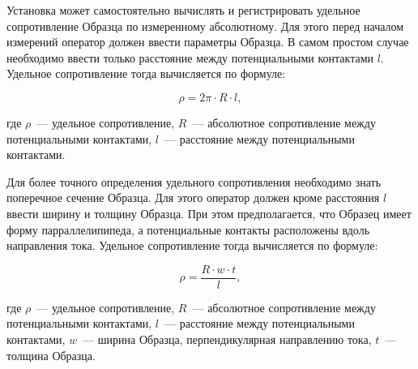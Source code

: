 Установка может самостоятельно вычислять и регистрировать удельное сопротивление Образца по измеренному абсолютному. Для этого перед началом измерений оператор должен ввести параметры Образца. В самом простом случае необходимо ввести только расстояние между потенциальными контактами $l$. Удельное сопротивление тогда вычисляется по формуле:

\begin{equation}
\rho = 2 \pi \cdot R \cdot l,
\end{equation}

\noindent где $\rho$~--- удельное сопротивление, $R$~--- абсолютное сопротивление между потенциальными контактами, $l$~--- расстояние между потенциальными контактами.

Для более точного определения удельного сопротивления необходимо знать поперечное сечение Образца. Для этого оператор должен кроме расстояния $l$ ввести ширину и толщину Образца. При этом предполагается, что Образец имеет форму парраллелипипеда, а потенциальные контакты расположены вдоль направления тока. Удельное сопротивление тогда вычисляется по формуле:

\begin{equation}
\rho = \frac{R \cdot w \cdot t}{l},
\end{equation}

\noindent где $\rho$~--- удельное сопротивление, $R$~--- абсолютное сопротивление между потенциальными контактами, $l$~--- расстояние между потенциальными контактами, $w$~--- ширина Образца, перпендикулярная направлению тока, $t$~--- толщина Образца.

